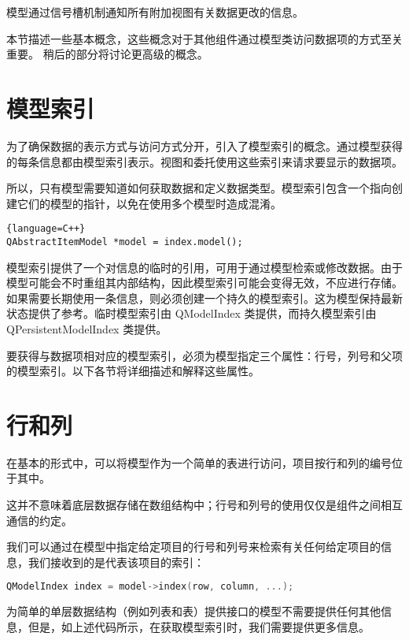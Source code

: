 模型通过信号槽机制通知所有附加视图有关数据更改的信息。

本节描述一些基本概念，这些概念对于其他组件通过模型类访问数据项的方式至关重要。 稍后的部分将讨论更高级的概念。

\section{模型索引}

为了确保数据的表示方式与访问方式分开，引入了模型索引的概念。通过模型获得的每条信息都由模型索引表示。视图和委托使用这些索引来请求要显示的数据项。

所以，只有模型需要知道如何获取数据和定义数据类型。模型索引包含一个指向创建它们的模型的指针，以免在使用多个模型时造成混淆。

\begin{lstlisting}{language=C++}
QAbstractItemModel *model = index.model();
\end{lstlisting}

模型索引提供了一个对信息的临时的引用，可用于通过模型检索或修改数据。由于模型可能会不时重组其内部结构，因此模型索引可能会变得无效，不应进行存储。如果需要长期使用一条信息，则必须创建一个持久的模型索引。这为模型保持最新状态提供了参考。临时模型索引由 QModelIndex 类提供，而持久模型索引由 QPersistentModelIndex 类提供。

要获得与数据项相对应的模型索引，必须为模型指定三个属性：行号，列号和父项的模型索引。以下各节将详细描述和解释这些属性。

\section{行和列}

在基本的形式中，可以将模型作为一个简单的表进行访问，项目按行和列的编号位于其中。

这并不意味着底层数据存储在数组结构中；行号和列号的使用仅仅是组件之间相互通信的约定。

我们可以通过在模型中指定给定项目的行号和列号来检索有关任何给定项目的信息，我们接收到的是代表该项目的索引：

\begin{lstlisting}[language=C++]
QModelIndex index = model->index(row, column, ...);
\end{lstlisting}


为简单的单层数据结构（例如列表和表）提供接口的模型不需要提供任何其他信息，但是，如上述代码所示，在获取模型索引时，我们需要提供更多信息。

